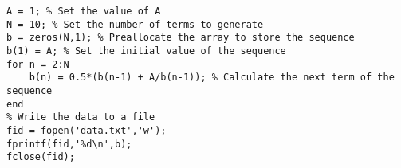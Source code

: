 \documentclass{article}
\begin{document}
\begin{lstlisting}
A = 1; % Set the value of A
N = 10; % Set the number of terms to generate
b = zeros(N,1); % Preallocate the array to store the sequence
b(1) = A; % Set the initial value of the sequence
for n = 2:N
    b(n) = 0.5*(b(n-1) + A/b(n-1)); % Calculate the next term of the sequence
end
% Write the data to a file
fid = fopen('data.txt','w');
fprintf(fid,'%d\n',b);
fclose(fid);
\end{lstlisting}
\end{document}
